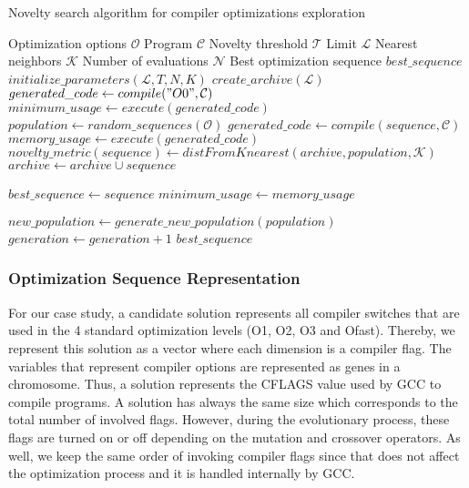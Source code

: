 \begin{algorithm}
	\caption{Novelty search algorithm for compiler optimizations exploration}
	\label{algo:search}
	\begin{algorithmic}[1]
		\REQUIRE Optimization options $\mathcal{O}$
		\REQUIRE Program $\mathcal{C}$
		\REQUIRE Novelty threshold $\mathcal{T}$
		\REQUIRE Limit $\mathcal{L}$
		\REQUIRE Nearest neighbors $\mathcal{K}$
		\REQUIRE Number of evaluations $\mathcal{N}$
		\ENSURE Best optimization sequence $best\_sequence$
		\STATE $initialize\_parameters(\mathcal{L},T,N,K)$
		\STATE $create\_archive(\mathcal{L})$
		\STATE 	$generated\_code \gets compile("O0",\mathcal{C})$
		\STATE 	$minimum\_usage \gets execute(generated\_code)$
		\STATE $population \gets random\_sequences(\mathcal{O})$
		\REPEAT
		\STATE 	$generated\_code \gets compile(sequence,\mathcal{C})$
		\STATE 	$memory\_usage \gets execute(generated\_code)$
		\STATE	$novelty\_metric(sequence) \gets distFromKnearest(archive,population,\mathcal{K})$
		\STATE	$archive \gets archive \cup sequence$
		\ENDIF
		
			\STATE	$best\_sequence \gets sequence$
			\STATE	$minimum\_usage \gets memory\_usage$
			\ENDIF
			
		\ENDFOR
		\STATE		$new\_population \gets generate\_new\_population(population)$
		\STATE		$generation \gets generation + 1$
		\RETURN $best\_sequence$
	\end{algorithmic}
\end{algorithm}


\subsubsection{Optimization Sequence Representation}
For our case study, a candidate solution represents all compiler switches that are used in the 4 standard optimization levels (O1, O2, O3 and Ofast). Thereby, we represent this solution as a vector where each dimension is a compiler flag. 
The variables that represent compiler options are represented as genes in a chromosome. 
Thus, a solution represents the CFLAGS value used by GCC to compile programs.
A solution has always the same size which corresponds to the total number of involved flags. 
However, during the evolutionary process, these flags are turned on or off depending on the mutation and crossover operators. As well, we keep the same order of invoking compiler flags since that does not affect the optimization process and it is handled internally by GCC.

